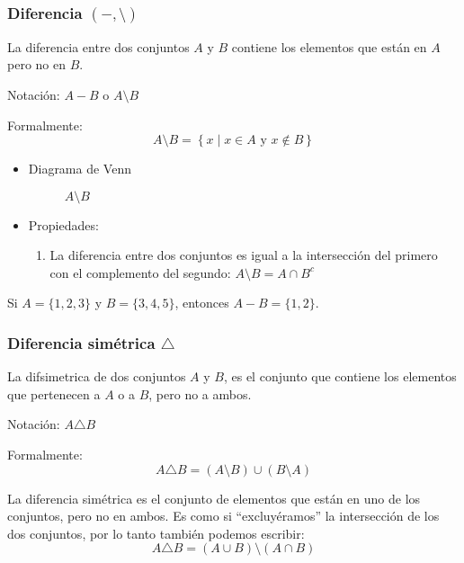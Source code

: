 \subsubsection{Diferencia $(-, \setminus)$}

\vspace{1em}
\begin{fmd-definition}
	La diferencia entre dos conjuntos \(A\) y \(B\) contiene los elementos que están en \(A\) pero no en \(B\).
	
	Notación: \(A - B\) o \( A \setminus B \)
	
	Formalmente:
	\[ A \setminus B = \left\{ x \mid x \in A \mbox{ y } x \not \in B \right\} \]
\end{fmd-definition}

\begin{itemize}
	\item Diagrama de Venn
	\begin{figure}[H]
		\centering
		\begin{venndiagram2sets}
			\fillOnlyA
		\end{venndiagram2sets}
		\caption*{$A \setminus B$}
	\end{figure}
	\item Propiedades:
	\begin{enumerate}[label=\roman*)]
		\item La diferencia entre dos conjuntos es igual a la intersección del primero con el complemento del segundo: \( A \setminus B = A \cap B^c \)
	\end{enumerate}
\end{itemize}

\begin{example}
	Si \(A = \{1, 2, 3\}\) y \(B = \{3, 4, 5\}\), entonces \(A - B = \{1, 2\}\).
\end{example}

\subsubsection{Diferencia simétrica $\triangle$}
\vspace{1em}
\begin{fmd-definition}
	La \gls{difsimetrica} de dos conjuntos \(A\) y \(B\), es el conjunto que contiene los elementos que pertenecen a \(A\) o a \(B\), pero no a ambos.
	
	Notación: \(A \triangle B\)
	
	Formalmente:
	$$A \triangle B = (A \setminus B) \cup (B \setminus A)$$
	
	La diferencia simétrica es el conjunto de elementos que están en uno de los conjuntos, pero no en ambos. Es como si ``excluyéramos'' la intersección de los dos conjuntos, por lo tanto también podemos escribir:
	\[ A \triangle B = \left( A \cup B \right) \setminus \left( A \cap B \right) \]
\end{fmd-definition}

